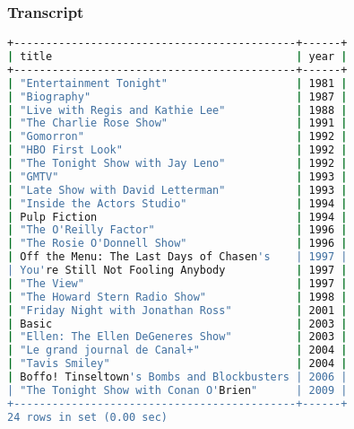 \subsubsection{Transcript}
\begin{lstlisting}[language=bash]
+--------------------------------------------+------+
| title                                      | year |
+--------------------------------------------+------+
| "Entertainment Tonight"                    | 1981 |
| "Biography"                                | 1987 |
| "Live with Regis and Kathie Lee"           | 1988 |
| "The Charlie Rose Show"                    | 1991 |
| "Gomorron"                                 | 1992 |
| "HBO First Look"                           | 1992 |
| "The Tonight Show with Jay Leno"           | 1992 |
| "GMTV"                                     | 1993 |
| "Late Show with David Letterman"           | 1993 |
| "Inside the Actors Studio"                 | 1994 |
| Pulp Fiction                               | 1994 |
| "The O'Reilly Factor"                      | 1996 |
| "The Rosie O'Donnell Show"                 | 1996 |
| Off the Menu: The Last Days of Chasen's    | 1997 |
| You're Still Not Fooling Anybody           | 1997 |
| "The View"                                 | 1997 |
| "The Howard Stern Radio Show"              | 1998 |
| "Friday Night with Jonathan Ross"          | 2001 |
| Basic                                      | 2003 |
| "Ellen: The Ellen DeGeneres Show"          | 2003 |
| "Le grand journal de Canal+"               | 2004 |
| "Tavis Smiley"                             | 2004 |
| Boffo! Tinseltown's Bombs and Blockbusters | 2006 |
| "The Tonight Show with Conan O'Brien"      | 2009 |
+--------------------------------------------+------+
24 rows in set (0.00 sec)
\end{lstlisting}

